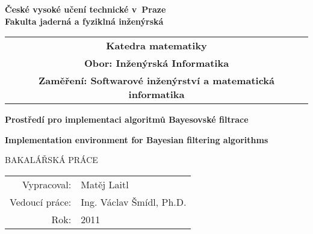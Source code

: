 \newcommand{\cvut}{České vysoké učení technické v~Praze}
\newcommand{\fjfi}{Fakulta jaderná a fyziklná inženýrská}
\newcommand{\km}{Katedra matematiky}
\newcommand{\obor}{Inženýrská Informatika}
\newcommand{\zamereni}{Softwarové inženýrství a matematická informatika}

\newcommand{\nazevcz}{Prostředí pro implementaci algoritmů Bayesovské filtrace}
\newcommand{\nazeven}{Implementation environment for Bayesian filtering algorithms}
\newcommand{\autor}{Matěj Laitl}
\newcommand{\rok}{2011}
\newcommand{\vedouci}{Ing. Václav Šmídl, Ph.D.}

\newcommand{\pracovisteVed}{Oddělení adaptivních systémů \\
	Ústav teorie informace a automatizace \\
	Akademie věd České republiky}
\newcommand{\konzultant}{---}
\newcommand{\pracovisteKonz}{}

\newcommand{\klicova}{TODO, klíčová slova, max. 5}
\newcommand{\keyword}{TODO, key, words}
\newcommand{\abstrCZ}{TODO Abstrakt práce (cca 7 vět, min. 80 slov)}
\newcommand{\abstrEN}{TODO English abstract}


\thispagestyle{empty}

\begin{center}
	{\Large  \bf  \cvut\\[2mm] \fjfi }
	\vspace{10mm}

	\begin{tabular}{c}
	{\bf \km}\\
	{\bf Obor: \obor}\\
	{\bf Zaměření: \zamereni}
	\end{tabular}

	\vspace{10mm} \epsfysize=20mm   \vspace{15mm}

	{\LARGE
	\textbf{\nazevcz}
	\par}

	\vspace{5mm}

	{\LARGE
	\textbf{\nazeven}
	\par}

	\vspace{30mm}
	{\Large BAKALÁŘSKÁ PRÁCE}

\end{center}

\vfill
{\large
\begin{tabular}{rl}
Vypracoval: & \autor\\
Vedoucí práce: & \vedouci\\
Rok: & \rok
\end{tabular}
}

